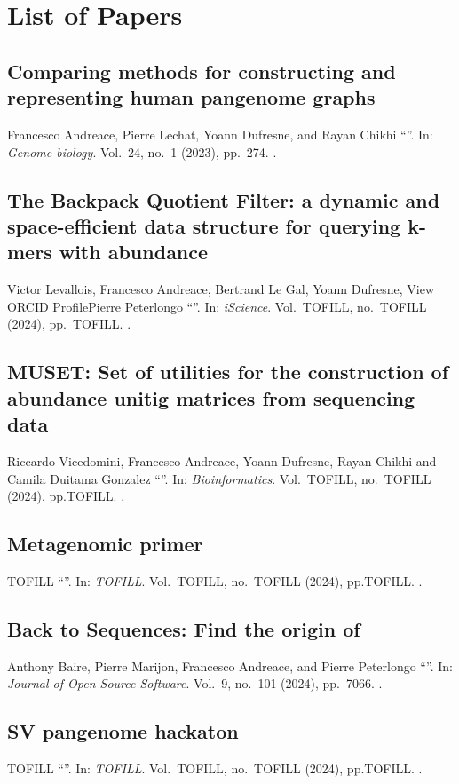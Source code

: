 \chapter{List of Papers}


\section*{Comparing methods for constructing and representing human pangenome graphs}
Francesco Andreace, Pierre Lechat, Yoann Dufresne, and Rayan Chikhi
\enquote{}.
In: \emph{Genome biology}.
Vol.\ 24,
no.\ 1
(2023),
pp.~274.
.

\section*{The Backpack Quotient Filter: a dynamic and space-efficient data structure for querying k-mers with abundance}
Victor Levallois, Francesco Andreace, Bertrand Le Gal, Yoann Dufresne, View ORCID ProfilePierre Peterlongo
\enquote{}.
In: \emph{iScience}.
Vol.\ TOFILL,
no.\ TOFILL
(2024),
pp.~TOFILL.
.


\section*{MUSET: Set of utilities for the construction of abundance unitig matrices from sequencing data}
Riccardo Vicedomini, Francesco Andreace, Yoann Dufresne, Rayan Chikhi and Camila Duitama Gonzalez 
\enquote{}.
In: \emph{Bioinformatics}.
Vol.\ TOFILL,
no.\ TOFILL
(2024),
pp.TOFILL.
.

\section*{Metagenomic primer}
TOFILL
\enquote{}.
In: \emph{TOFILL}.
Vol.\ TOFILL,
no.\ TOFILL
(2024),
pp.TOFILL.
.


\section*{Back to Sequences: Find the origin of \kmers}
Anthony Baire, Pierre Marijon, Francesco Andreace, and Pierre
Peterlongo 
\enquote{}.
In: \emph{Journal of Open Source Software}.
Vol.\ 9,
no.\ 101
(2024),
pp.~7066.
.



\section*{SV pangenome hackaton}
TOFILL
\enquote{}.
In: \emph{TOFILL}.
Vol.\ TOFILL,
no.\ TOFILL
(2024),
pp.TOFILL.
.